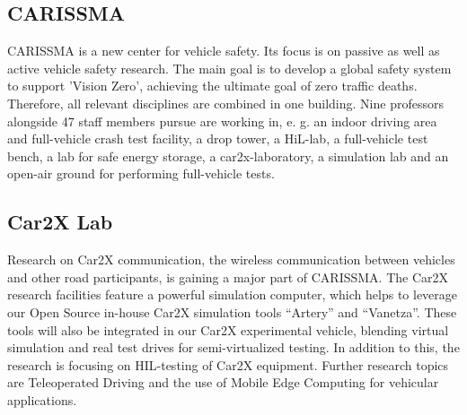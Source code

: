 \subsection{CARISSMA}

\ac{CARISSMA} is a new center for vehicle safety. Its focus is on passive as
well as active vehicle safety research. The main goal is to develop a global
safety system to support 'Vision Zero', achieving the ultimate goal of zero
traffic deaths. Therefore, all relevant disciplines are combined in one
building. Nine professors alongside 47 staff members pursue are working in, e.
g. an indoor driving area and full-vehicle crash test facility, a drop tower,
a HiL-lab, a full-vehicle test bench, a lab for safe energy storage, a
car2x-laboratory, a simulation lab and an open-air ground for performing
full-vehicle tests.

\subsection{Car2X Lab}

Research on Car2X communication, the wireless communication between vehicles
and other road participants, is gaining a major part of \ac{CARISSMA}. The
Car2X research facilities feature a powerful simulation computer, which helps
to leverage our Open Source in-house Car2X simulation tools “Artery” and
“Vanetza”. These tools will also be integrated in our Car2X experimental
vehicle, blending virtual simulation and real test drives for semi-virtualized
testing. In addition to this, the research is focusing on HIL-testing of Car2X
equipment. Further research topics are Teleoperated Driving and the use of
Mobile Edge Computing for vehicular applications.
